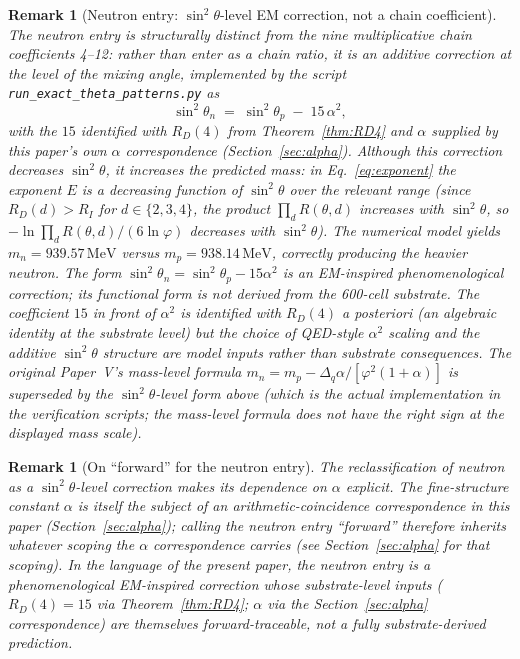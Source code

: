 \documentclass[12pt]{article}
\newtheorem{remark}[theorem]{Remark}
\newcommand{\phig}{\varphi}
\begin{document}
\begin{remark}[Neutron entry: $\sin^2\theta$-level EM correction, not a chain coefficient]\label{rem:neutron-em}
The neutron entry is structurally distinct from the nine multiplicative chain coefficients 4--12: rather than enter as a chain ratio, it is an additive correction at the level of the mixing angle, implemented by the script \texttt{run\_exact\_theta\_patterns.py} as
\[
   \sin^2\theta_n \;=\; \sin^2\theta_p \;-\; 15\,\alpha^2,
\]
with the $15$ identified with $R_D(4)$ from Theorem~\ref{thm:RD4} and $\alpha$ supplied by this paper's own $\alpha$ correspondence (Section~\ref{sec:alpha}). Although this correction \emph{decreases} $\sin^2\theta$, it \emph{increases} the predicted mass: in Eq.~\eqref{eq:exponent} the exponent $E$ is a decreasing function of $\sin^2\theta$ over the relevant range (since $R_D(d) > R_I$ for $d \in \{2, 3, 4\}$, the product $\prod_d R(\theta, d)$ increases with $\sin^2\theta$, so $-\ln \prod_d R(\theta, d) / (6\ln\phig)$ decreases with $\sin^2\theta$). The numerical model yields $m_n = 939.57\,\mathrm{MeV}$ versus $m_p = 938.14\,\mathrm{MeV}$, correctly producing the heavier neutron. The form $\sin^2\theta_n = \sin^2\theta_p - 15\alpha^2$ is an EM-inspired phenomenological correction; its functional form is not derived from the 600-cell substrate. The \emph{coefficient} $15$ in front of $\alpha^2$ is identified with $R_D(4)$ \emph{a posteriori} (an algebraic identity at the substrate level) but the choice of QED-style $\alpha^2$ scaling and the additive $\sin^2\theta$ structure are model inputs rather than substrate consequences. The original Paper~V's mass-level formula $m_n = m_p - \Delta_q \alpha / [\phig^2 (1+\alpha)]$ is superseded by the $\sin^2\theta$-level form above (which is the actual implementation in the verification scripts; the mass-level formula does not have the right sign at the displayed mass scale).
\end{remark}

\begin{remark}[On ``forward'' for the neutron entry]
The reclassification of neutron as a $\sin^2\theta$-level correction makes its dependence on $\alpha$ explicit. The fine-structure constant $\alpha$ is itself the subject of an arithmetic-coincidence correspondence in this paper (Section~\ref{sec:alpha}); calling the neutron entry ``forward'' therefore inherits whatever scoping the $\alpha$ correspondence carries (see Section~\ref{sec:alpha} for that scoping). In the language of the present paper, the neutron entry is a \emph{phenomenological EM-inspired correction whose substrate-level inputs ($R_D(4) = 15$ via Theorem~\ref{thm:RD4}; $\alpha$ via the Section~\ref{sec:alpha} correspondence) are themselves forward-traceable}, not a fully substrate-derived prediction.
\end{remark}
\end{document}
